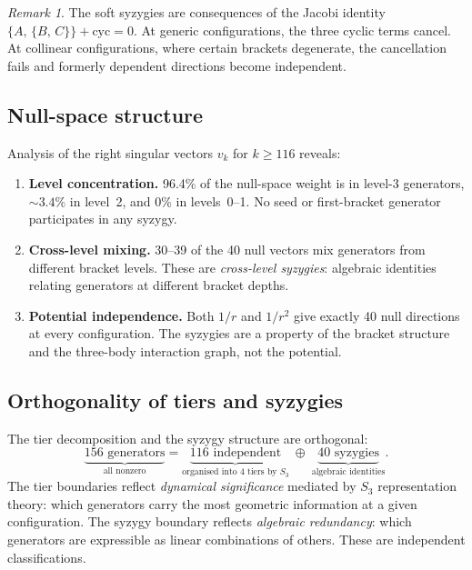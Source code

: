 \documentclass[11pt,a4paper]{article}
\theoremstyle{remark}
\newtheorem{remark}[theorem]{Remark}
\newcommand{\pb}[2]{\{#1,\,#2\}}
\newcommand{\SG}{S_3}
\begin{document}
\begin{remark}
The soft syzygies are consequences of the Jacobi
identity $\pb{A}{\pb{B}{C}} + \text{cyc} = 0$.  At
generic configurations, the three cyclic terms cancel.
At collinear configurations, where certain brackets
degenerate, the cancellation fails and formerly dependent
directions become independent.
\end{remark}

\subsection{Null-space structure}

Analysis of the right singular vectors $v_k$ for
$k \ge 116$ reveals:

\begin{enumerate}[nosep]
  \item \textbf{Level concentration.}  96.4\% of the
    null-space weight is in level-3 generators,
    $\sim\!3.4\%$ in level~2, and 0\% in levels~0--1.
    No seed or first-bracket generator participates in
    any syzygy.

  \item \textbf{Cross-level mixing.}  30--39 of the
    40 null vectors mix generators from different bracket
    levels.  These are \emph{cross-level syzygies}:
    algebraic identities relating generators at different
    bracket depths.

  \item \textbf{Potential independence.}  Both $1/r$ and
    $1/r^2$ give exactly 40 null directions at every
    configuration.  The syzygies are a property of the
    bracket structure and the three-body interaction
    graph, not the potential.
\end{enumerate}

\subsection{Orthogonality of tiers and syzygies}

The tier decomposition and the syzygy structure are
orthogonal:
\[
\underbrace{156\text{ generators}}_{\text{all nonzero}}
= \underbrace{116\text{ independent}}_{\text{organised
  into 4 tiers by } \SG}
\;\oplus\; \underbrace{40\text{ syzygies}}_{\text{algebraic
  identities}}.
\]
The tier boundaries reflect \emph{dynamical significance}
mediated by $\SG$ representation theory: which generators
carry the most geometric information at a given
configuration.  The syzygy boundary reflects
\emph{algebraic redundancy}: which generators are
expressible as linear combinations of others.  These are
independent classifications.
\end{document}
